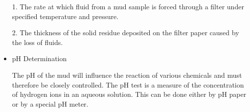 \begin{itemize}
1. The rate at which fluid from a mud sample is forced through a filter under specified temperature and pressure.

2. The thickness of the solid residue deposited on the filter paper caused by the loss of fluids.

\item pH Determination

The pH of the mud will influence the reaction of various chemicals and must therefore be closely controlled. The pH test is a measure of the concentration of hydrogen ions in an aqueous solution. This can be done either by pH paper or by a special pH meter.

\end{itemize}
 
 
 
